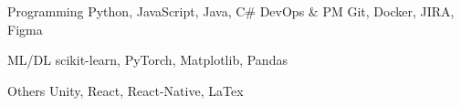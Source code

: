 

\begin{cvskills}
  
    \cvskill
      {Programming} %
      { Python, JavaScript, Java, C\#} %
  \cvskill
    {DevOps \& PM} %
    {Git, Docker, JIRA, Figma} %

  \cvskill
    {ML/DL} %
    {scikit-learn, PyTorch, Matplotlib, Pandas } %

  \cvskill
    {Others} %
    {Unity, React, React-Native, LaTex} %

\end{cvskills}
